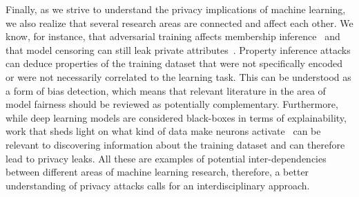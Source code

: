 Finally, as we strive to understand the privacy implications of machine learning, we also realize that several research areas are connected and affect each other. We know, for instance, that adversarial training affects membership inference~ and that model censoring can still leak private attributes~. Property inference attacks can deduce properties of the training dataset that were not specifically encoded or were not necessarily correlated to the learning task. This can be understood as a form of bias detection, which means that relevant literature in the area of model fairness should be reviewed as potentially complementary. Furthermore, while deep learning models are considered black-boxes in terms of explainability, work that sheds light on what kind of data make neurons activate~ can be relevant to discovering information about the training dataset and can therefore lead to privacy leaks. All these are examples of potential inter-dependencies between different areas of machine learning research, therefore, a better understanding of privacy attacks calls for an interdisciplinary approach.

